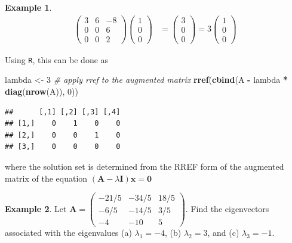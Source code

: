 \documentclass[
]{book}
\newenvironment{Shaded}{\begin{snugshade}}{\end{snugshade}}
\newcommand{\CommentTok}[1]{\textcolor[rgb]{0.56,0.35,0.01}{\textit{#1}}}
\newcommand{\DecValTok}[1]{\textcolor[rgb]{0.00,0.00,0.81}{#1}}
\newcommand{\KeywordTok}[1]{\textcolor[rgb]{0.13,0.29,0.53}{\textbf{#1}}}
\newcommand{\NormalTok}[1]{#1}
\newcommand{\OperatorTok}[1]{\textcolor[rgb]{0.81,0.36,0.00}{\textbf{#1}}}
\newcommand{\StringTok}[1]{\textcolor[rgb]{0.31,0.60,0.02}{#1}}
\theoremstyle{definition}
\theoremstyle{definition}
\newtheorem{example}{Example}[chapter]
\theoremstyle{definition}
\theoremstyle{definition}
\theoremstyle{remark}
\begin{document}
\begin{example}
\[
\begin{aligned}
\begin{pmatrix} 3 & 6 & -8 \\ 0 & 0 & 6 \\ 0 & 0 & 2 \end{pmatrix} \begin{pmatrix} 1 \\ 0 \\ 0 \end{pmatrix} & = \begin{pmatrix} 3 \\ 0 \\ 0 \end{pmatrix}  = 3 \begin{pmatrix} 1 \\ 0 \\ 0 \end{pmatrix}
\end{aligned}
\]

Using \texttt{R}, this can be done as

\begin{Shaded}
\begin{Highlighting}[]
\NormalTok{lambda <-}\StringTok{ }\DecValTok{3}
\CommentTok{# apply rref to the augmented matrix}
\KeywordTok{rref}\NormalTok{(}\KeywordTok{cbind}\NormalTok{(A }\OperatorTok{-}\StringTok{ }\NormalTok{lambda }\OperatorTok{*}\StringTok{ }\KeywordTok{diag}\NormalTok{(}\KeywordTok{nrow}\NormalTok{(A)), }\DecValTok{0}\NormalTok{))}
\end{Highlighting}
\end{Shaded}

\begin{verbatim}
##      [,1] [,2] [,3] [,4]
## [1,]    0    1    0    0
## [2,]    0    0    1    0
## [3,]    0    0    0    0
\end{verbatim}

where the solution set is determined from the RREF form of the augmented matrix of the equation \(\left( \mathbf{A} - \lambda \mathbf{I} \right) \mathbf{x} = \mathbf{0}\)
\end{example}

\begin{example}
Let \(\mathbf{A} = \begin{pmatrix} -21/5 & -34/5 & 18/5 \\ -6/5 & -14/5 & 3/5 \\ -4 & -10 & 5 \end{pmatrix}\). Find the eigenvectors associated with the eigenvalues (a) \(\lambda_1 = -4\), (b) \(\lambda_2 = 3\), and (c) \(\lambda_3 = -1\).
\end{example}
\end{document}
